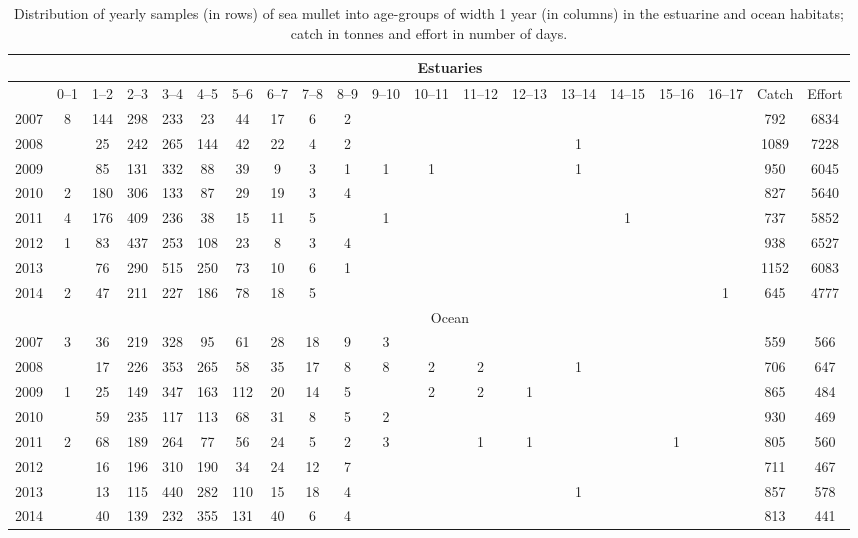 \begin{sidewaystable}[ht]
\tiny
\centering
\begin{tabular}{|l|c|c|c|c|c|c|c|c|c|c|c|c|c|c|c|c|c||c||c|}
\hline
& \multicolumn{19}{|c|}{Estuaries} \\
\hline
 & 0--1 & 1--2 & 2--3 & 3--4 & 4--5 & 5--6 & 6--7 & 7--8 & 8--9 & 9--10 & 10--11 & 11--12 & 12--13 & 13--14 & 14--15 & 15--16 & 16--17 & Catch & Effort \\ 
  \hline
2007 & 8 & 144 & 298 & 233 & 23 & 44 & 17 & 6 & 2 &  &  &  &  &  &  &  &  & 792 & 6834 \\ 
  2008 &  & 25 & 242 & 265 & 144 & 42 & 22 & 4 & 2 &  &  &  &  & 1 &  &  &  & 1089 & 7228 \\ 
  2009 &  & 85 & 131 & 332 & 88 & 39 & 9 & 3 & 1 & 1 & 1 &  &  & 1 &  &  &  & 950 & 6045 \\ 
  2010 & 2 & 180 & 306 & 133 & 87 & 29 & 19 & 3 & 4 &  &  &  &  &  &  &  &  & 827 & 5640 \\ 
  2011 & 4 & 176 & 409 & 236 & 38 & 15 & 11 & 5 &  & 1 &  &  &  &  & 1 &  &  & 737 & 5852 \\ 
  2012 & 1 & 83 & 437 & 253 & 108 & 23 & 8 & 3 & 4 &  &  &  &  &  &  &  &  & 938 & 6527 \\ 
  2013 &  & 76 & 290 & 515 & 250 & 73 & 10 & 6 & 1 &  &  &  &  &  &  &  &  & 1152 & 6083 \\ 
  2014 & 2 & 47 & 211 & 227 & 186 & 78 & 18 & 5 &  &  &  &  &  &  &  &  & 1 & 645 & 4777 \\ 
\hline
& \multicolumn{19}{|c|}{Ocean} \\
\hline
  2007 & 3 & 36 & 219 & 328 & 95 & 61 & 28 & 18 & 9 & 3 &  &  &  &  &  &  &  & 559 & 566 \\ 
  2008 &  & 17 & 226 & 353 & 265 & 58 & 35 & 17 & 8 & 8 & 2 & 2 &  & 1 &  &  &  & 706 & 647 \\ 
  2009 & 1 & 25 & 149 & 347 & 163 & 112 & 20 & 14 & 5 &  & 2 & 2 & 1 &  &  &  &  & 865 & 484 \\ 
  2010 &  & 59 & 235 & 117 & 113 & 68 & 31 & 8 & 5 & 2 &  &  &  &  &  &  &  & 930 & 469 \\ 
  2011 & 2 & 68 & 189 & 264 & 77 & 56 & 24 & 5 & 2 & 3 &  & 1 & 1 &  &  & 1 &  & 805 & 560 \\ 
  2012 &  & 16 & 196 & 310 & 190 & 34 & 24 & 12 & 7 &  &  &  &  &  &  &  &  & 711 & 467 \\ 
  2013 &  & 13 & 115 & 440 & 282 & 110 & 15 & 18 & 4 &  &  &  &  & 1 &  &  &  & 857 & 578 \\ 
  2014 &  & 40 & 139 & 232 & 355 & 131 & 40 & 6 & 4 &  &  &  &  &  &  &  &  & 813 & 441 \\ 
   \hline
\end{tabular}
\caption{Distribution of yearly samples (in rows) of sea mullet into age-groups of width 1 year (in columns) in the estuarine and ocean habitats; catch in tonnes and effort in number of days.} 
\label{tab:Mullet-NbAtAge}
\end{sidewaystable}
